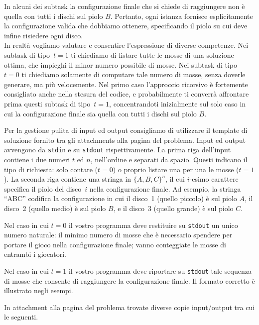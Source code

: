 In alcuni dei subtask la configurazione finale che si chiede di raggiungere non è quella con tutti i dischi sul piolo $B$. Pertanto, ogni istanza fornisce esplicitamente la configurazione valida che dobbiamo ottenere, specificando il piolo su cui deve infine risiedere ogni disco.\\ 

In realtà vogliamo valutare e consentire l'espressione di diverse competenze. Nei subtask di tipo~$t=1$ ti chiediamo di listare tutte le mosse di una soluzione ottima, che impieghi il minor numero possibile di mosse.
Nei subtask di tipo~$t=0$ ti chiediamo solamente di computare tale numero di mosse, senza doverle generare, ma più velocemente.
Nel primo caso l'approccio ricorsivo è fortemente consigliato anche nella stesura del codice, e probabilmente ti converrà affrontare prima questi subtask di tipo~$t=1$, concentrandoti inizialmente sul solo caso in cui la configurazione finale sia quella con tutti i dischi sul piolo $B$.



Per la gestione pulita di input ed output consigliamo di utilizzare il template di soluzione fornito tra gli attachments alla pagina del problema.
Input ed output avvengono da \verb'stdin'
e su \verb'stdout' rispettivamente.
La prima riga dell'input contiene i due numeri $t$ ed $n$, nell'ordine e separati da spazio. Questi indicano il tipo di richiesta: solo contare ($t=0$) o proprio listare una per una le mosse ($t=1$).
La seconda riga contiene una stringa in $\{A,B,C\}^n$, il cui $i$-esimo carattere specifica il piolo del disco~$i$ nella configurazione finale. Ad esempio, la stringa ``ABC'' codifica la configurazione in cui il disco~1 (quello piccolo) è sul piolo $A$, il disco~2 (quello medio) è sul piolo $B$, e il disco~3 (quello grande) è sul piolo $C$. 

\indent
Nel caso in cui $t=0$ il vostro programma deve restituire su \verb'stdout' un unico numero naturale: il minimo numero di mosse che è necessario spendere per portare il gioco nella configurazione finale; vanno conteggiate le mosse di entrambi i giocatori.

\indent
Nel caso in cui $t= 1$ il vostro programma deve riportare su \verb'stdout' tale sequenza di mosse che consente di raggiungere la configurazione finale. Il formato corretto è illustrato negli esempi.



In attachment alla pagina del problema trovate diverse copie input/output tra cui le seguenti.


